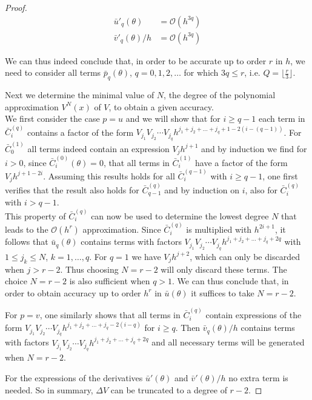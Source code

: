 \begin{proof}
  \begin{align*}
    \bar{u}'_{q}(\theta)   & =  \mathcal{O}(h^{3q}) \\
    \bar{v}'_{q}(\theta)/h & = \mathcal{O}(h^{3q})
  \end{align*}

  We can thus indeed conclude that, in order to be accurate up to order $r$ in $h$, we need to consider all terms $\bar{p}_q(\theta)$, $q=0,1,2,\ldots$ for which $3q \leq r$, i.e. $Q= \lfloor \frac{r}{3} \rfloor$.

  Next we determine the minimal value of $N$, the degree of the polynomial approximation $V^{N}(x)$ of $V$, to obtain a given accuracy. \\
  We first consider the case $p=u$ and we will show that for $i \geq q-1$ each term in $\bar{C}_i^{(q)}$ contains a factor of the form
  $ V_{j_1} V_{j_2} \cdots V_{j_q} h^{j_1+j_2+\ldots+j_q+1 - 2 (i-(q-1))}$.
  For $\bar{C}_0^{(1)}$ all terms indeed contain an expression $V_j h^{j+1}$ and by induction we find for $i>0$, since $\bar{C}_i^{(0)}(\theta)=0$, that all terms in $\bar{C}_i^{(1)}$ have a factor of the form $V_j h^{j+1-2i}$.
  Assuming this results holds for all $\bar{C}_i^{(q-1)}$ with $i\geq q - 1$, one first verifies that the result also holds for
  $\bar{C}_{q-1}^{(q)}$ and by induction on $i$,  also for $\bar{C}_{i}^{(q)}$ with $i>q-1$.\\
  This property of $\bar{C}_i^{(q)}$ can now be used to determine the lowest degree $N$ that leads to the $\mathcal{O}(h^r)$ approximation. Since $\bar{C}_i^{(q)}$ is multiplied with $h^{2i+1}$, it follows that  $\bar{u}_q(\theta)$ contains terms with factors $ V_{j_1} V_{j_2} \cdots V_{j_q} h^{j_1+j_2+\ldots+j_q+ 2 q }$ with
  $1 \leq j_k \leq N$, $k=1,\ldots, q$. For $q=1$ we have $V_{j} h^{j+2} $, which can only be discarded when $j>r-2$. Thus choosing $N=r-2$ will only discard these terms. The choice $N=r-2$ is also sufficient when $q>1$. We can thus conclude that, in order to obtain accuracy up to order $h^r$ in $\bar{u}(\theta)$ it suffices to take $N=r-2$.


  For $p=v$, one similarly shows that all terms in $\bar{C}_i^{(q)}$ contain expressions of the form $ V_{j_1} V_{j_2} \cdots V_{j_q} h^{j_1+j_2+\ldots+j_q - 2 (i-q)}$ for $i \geq q$. Then $\bar{v}_q(\theta)/h$ contains terms with factors $ V_{j_1} V_{j_2} \cdots V_{j_q} h^{j_1+j_2+\ldots+j_q+ 2 q}$ and all necessary terms will be generated when $N = r-2$.

  For the expressions of the derivatives $\bar{u}'(\theta)$ and $\bar{v}'(\theta)/h$ no extra term is needed. So in summary, $\Delta V$ can be truncated to a degree of $r - 2$.

\end{proof}

